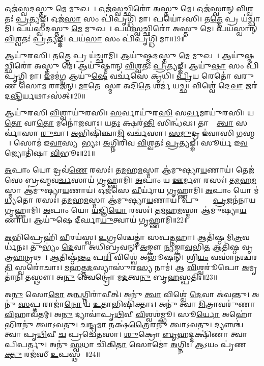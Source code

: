 𑌓𑌜॑𑌸𑍍𑌵𑌦𑌸𑍍𑌤𑍁 \ul{𑌮𑍇} 𑌮𑍁𑌖𑌮𑍍᳚।
𑌓𑌜॑\ul{𑌸𑍍𑌵}𑌚𑍍𑌛𑌿𑌰𑍋॑ 𑌅𑌸𑍍𑌤𑍁 𑌮𑍇।
𑌓𑌜॑𑌸𑍍𑌵𑌾𑌨𑍍 \ul{𑌵𑌿}𑌶𑍍𑌵𑌤𑌃॑ \ul{𑌪𑍍𑌰}𑌤𑍍𑌯𑌙𑍍𑌙𑍍।
𑌓𑌜॑\ul{𑌸𑌾} 𑌸𑌂 𑌪𑌿॑𑌪𑍃𑌗𑍍𑌧𑌿 𑌮𑌾।
𑌪𑌯𑍋॑𑌽𑌸𑌿।
𑌤\ul{𑌤𑍍𑌤𑍇} 𑌪𑍍𑌰 𑌯॑𑌚𑍍𑌛𑌾𑌮𑌿।
𑌪𑌯॑𑌸𑍍𑌵𑌦𑌸𑍍𑌤𑍁 \ul{𑌮𑍇} 𑌮𑍁𑌖𑌮𑍍᳚।
𑌪𑌯॑\ul{𑌸𑍍𑌵}𑌚𑍍𑌛𑌿𑌰𑍋॑ 𑌅𑌸𑍍𑌤𑍁 𑌮𑍇।
𑌪𑌯॑𑌸𑍍𑌵𑌾𑌨𑍍 \ul{𑌵𑌿}𑌶𑍍𑌵𑌤𑌃॑ \ul{𑌪𑍍𑌰}𑌤𑍍𑌯𑌙𑍍𑌙𑍍।
𑌪𑌯॑\ul{𑌸𑌾} 𑌸𑌂 𑌪𑌿॑𑌪𑍃𑌗𑍍𑌧𑌿 𑌮𑌾॥19॥

𑌆𑌯𑍁॑𑌰𑌸𑌿।
𑌤\ul{𑌤𑍍𑌤𑍇} 𑌪𑍍𑌰 𑌯॑𑌚𑍍𑌛𑌾𑌮𑌿।
𑌆𑌯𑍁॑𑌷𑍍𑌮𑌦𑌸𑍍𑌤𑍁 \ul{𑌮𑍇} 𑌮𑍁𑌖𑌮𑍍᳚।
𑌆𑌯𑍁॑\ul{𑌷𑍍𑌮}𑌚𑍍𑌛𑌿𑌰𑍋॑ 𑌅𑌸𑍍𑌤𑍁 𑌮𑍇।
𑌆𑌯𑍁॑𑌷𑍍𑌮𑌾𑌨𑍍 \ul{𑌵𑌿}𑌶𑍍𑌵𑌤𑌃॑ \ul{𑌪𑍍𑌰}𑌤𑍍𑌯𑌙𑍍𑌙𑍍।
𑌆𑌯𑍁॑\ul{𑌷𑌾} 𑌸𑌂 𑌪𑌿॑𑌪𑍃𑌗𑍍𑌧𑌿 𑌮𑌾।
\ul{𑌇}𑌮𑌮॑\ul{𑌗𑍍𑌨} 𑌆𑌯𑍁॑\ul{𑌷𑍇} 𑌵𑌰𑍍𑌚॑𑌸𑍇 𑌕𑍃𑌧𑌿।
\ul{𑌪𑍍𑌰𑌿}𑌯 𑌰𑍇𑌤𑍋॑ 𑌵𑌰𑍁𑌣 𑌸𑍋𑌮 𑌰𑌾𑌜𑌨𑍍।
\ul{𑌮𑌾}𑌤𑍇𑌵𑌾᳚𑌸𑍍𑌮𑌾 𑌅𑌦𑌿\ul{𑌤𑍇} 𑌶𑌰𑍍𑌮॑ 𑌯𑌚𑍍𑌛।
𑌵𑌿𑌶𑍍𑌵𑍇॑ 𑌦𑍇\ul{𑌵𑌾} 𑌜𑌰॑𑌦\ul{𑌷𑍍𑌟𑌿}𑌰𑍍𑌯𑌥𑌾\-𑌽𑌸॑𑌤𑍍॥20॥

𑌆𑌯𑍁॑𑌰𑌸𑌿 \ul{𑌵𑌿}𑌶𑍍𑌵𑌾𑌯𑍁॑𑌰𑌸𑌿।
\ul{𑌸}𑌰𑍍𑌵𑌾𑌯𑍁॑𑌰\ul{𑌸𑌿} 𑌸\ul{𑌰𑍍𑌵}𑌮𑌾𑌯𑍁॑𑌰𑌸𑌿।
𑌯\ul{𑌤𑍋} 𑌵𑌾\ul{𑌤𑍋} 𑌮𑌨𑍋॑𑌜𑌵𑌾𑌃।
𑌯\ul{𑌤𑌃} 𑌕𑍍𑌷𑌰॑\ul{𑌨𑍍𑌤𑌿} 𑌸𑌿𑌨𑍍𑌧॑𑌵𑌃।
𑌤𑌾𑌸𑌾𑌂᳚ \ul{𑌤𑍍𑌵𑌾} 𑌸𑌰𑍍𑌵𑌾॑𑌸𑌾 \ul{𑌰𑍁}𑌚𑌾।
\ul{𑌅}𑌭𑌿𑌷𑌿॑𑌞𑍍𑌚𑌾\ul{𑌮𑌿} 𑌵𑌰𑍍𑌚॑𑌸𑌾।
\ul{𑌸}\ul{𑌮𑍁}𑌦𑍍𑌰 𑌇॑𑌵𑌾𑌸𑌿 \ul{𑌗}𑌹𑍍𑌮𑌨𑌾᳚।
𑌸𑍋𑌮॑ 𑌇\ul{𑌵𑌾}𑌸𑍍𑌯𑌦𑌾᳚𑌭𑍍𑌯𑌃।
\ul{𑌅}𑌗𑍍𑌨𑌿𑌰𑌿॑𑌵 \ul{𑌵𑌿}𑌶𑍍𑌵𑌤𑌃॑ \ul{𑌪𑍍𑌰}𑌤𑍍𑌯𑌙𑍍𑌙𑍍।
𑌸𑍂𑌰𑍍𑌯॑ 𑌇\ul{𑌵} 𑌜𑍍𑌯𑍋𑌤𑌿॑𑌷𑌾 \ul{𑌵𑌿}𑌭𑍂𑌃॥21॥

\ul{𑌅}𑌪𑌾𑌂 𑌯𑍋 𑌦𑍍𑌰𑌵॑\ul{𑌣𑍇} 𑌰𑌸𑌃॑।
𑌤\ul{𑌮}𑌹\ul{𑌮}𑌸𑍍𑌮𑌾 𑌆॑𑌮𑍁𑌷𑍍𑌯𑌾\ul{𑌯}𑌣𑌾𑌯॑।
𑌤𑍇𑌜॑𑌸𑍇 𑌬𑍍𑌰𑌹𑍍𑌮𑌵\ul{𑌰𑍍𑌚}𑌸𑌾𑌯॑ 𑌗𑍃𑌹𑍍𑌣𑌾𑌮𑌿।
\ul{𑌅}𑌪𑌾𑌂 𑌯 \ul{𑌊}𑌰𑍍𑌮𑍗 𑌰𑌸𑌃॑।
𑌤\ul{𑌮}𑌹\ul{𑌮}𑌸𑍍𑌮𑌾 𑌆॑𑌮𑍁𑌷𑍍𑌯𑌾\ul{𑌯}𑌣𑌾𑌯॑।
𑌓𑌜॑𑌸𑍇 \ul{𑌵𑍀}𑌰𑍍𑌯𑌾॑𑌯 𑌗𑍃𑌹𑍍𑌣𑌾𑌮𑌿।
\ul{𑌅}𑌪𑌾𑌂 𑌯𑍋 𑌮॑\ul{𑌧𑍍𑌯}𑌤𑍋 𑌰𑌸𑌃॑।
𑌤\ul{𑌮}𑌹\ul{𑌮}𑌸𑍍𑌮𑌾 𑌆॑𑌮𑍁𑌷𑍍𑌯𑌾\ul{𑌯}𑌣𑌾𑌯॑।
𑌪𑍁𑌷𑍍𑌟𑍍𑌯𑍈᳚ \ul{𑌪𑍍𑌰}𑌜𑌨॑𑌨𑌾𑌯 𑌗𑍃𑌹𑍍𑌣𑌾𑌮𑌿।
\ul{𑌅}𑌪𑌾𑌂 𑌯𑍋 \ul{𑌯}𑌜𑍍𑌞𑌿\ul{𑌯𑍋} 𑌰𑌸𑌃॑।
𑌤\ul{𑌮}𑌹\ul{𑌮}𑌸𑍍𑌮𑌾 𑌆॑𑌮𑍁𑌷𑍍𑌯𑌾\ul{𑌯}𑌣𑌾𑌯॑।
𑌆𑌯𑍁॑𑌷𑍇 𑌦𑍀𑌰𑍍𑌘𑌾\ul{𑌯𑍁}𑌤𑍍𑌵𑌾𑌯॑ 𑌗𑍃𑌹𑍍𑌣𑌾𑌮𑌿॥22॥\anuvakamend[𑌗𑍋𑌷𑍍𑌵𑍋𑌜॑𑌸𑍍𑌵𑌨𑍍𑌤\dng{ꣴ} 𑌶𑍍𑌰𑍀\ul{𑌣𑌾}𑌮𑍍𑌯𑍋𑌜𑍋॑𑌽\ul{𑌸𑌿} 𑌤\ul{𑌤𑍍𑌤𑍇} 𑌪𑍍𑌰𑌯॑𑌚𑍍𑌛𑌾\ul{𑌮𑌿} 𑌪𑌯॑\ul{𑌸𑌾} 𑌸𑌮𑍍𑌪𑌿॑𑌪𑍃\ul{𑌗𑍍𑌧𑌿} 𑌮𑌾𑌽𑌸॑\ul{𑌦𑍍𑌵𑌿}𑌭𑍂\ul{𑌰𑍍𑌯}𑌜𑍍𑌞𑌿\ul{𑌯𑍋} 𑌰\ul{𑌸𑍋} 𑌦𑍍𑌵𑍇 𑌚॑]

\ul{𑌅}𑌭𑌿𑌪𑍍𑌰𑍇𑌹𑌿॑ \ul{𑌵𑍀}𑌰𑌯॑𑌸𑍍𑌵।
\ul{𑌉}𑌗𑍍𑌰𑌶𑍍𑌚𑍇𑌤𑍍𑌤𑌾॑ 𑌸𑌪\ul{𑌤𑍍𑌨}𑌹𑌾।
𑌆𑌤𑌿॑𑌷𑍍𑌠 𑌮𑌿\ul{𑌤𑍍𑌰}𑌵𑌰𑍍𑌧॑𑌨𑌃।
𑌤𑍁𑌭𑍍𑌯𑌂॑ \ul{𑌦𑍇}𑌵𑌾 𑌅𑌧𑌿॑𑌬𑍍𑌰𑌵𑌨𑍍।
\ul{𑌅}𑌙𑍍𑌕𑍗 \ul{𑌨𑍍𑌯}𑌙𑍍𑌕𑌾\ul{𑌵}𑌭𑌿\ul{𑌤} 𑌆𑌤𑌿॑𑌷𑍍𑌠 𑌵𑍃𑌤𑍍𑌰\ul{𑌹}𑌨𑍍𑌰𑌥𑌮𑍍᳚।
\ul{𑌆}𑌤𑌿𑌷𑍍𑌠॑\ul{𑌨𑍍𑌤𑌂} 𑌪\ul{𑌰𑌿} 𑌵𑌿𑌶𑍍𑌵𑍇॑ 𑌅𑌭𑍂𑌷𑌨𑍍।
𑌶𑍍𑌰𑌿\ul{𑌯𑌂} 𑌵𑌸𑌾॑𑌨𑌶𑍍𑌚𑌰\ul{𑌤𑌿} 𑌸𑍍𑌵𑌰𑍋॑𑌚𑌾𑌃।
\ul{𑌮}𑌹𑌤𑍍𑌤\ul{𑌦}𑌸𑍍𑌯𑌾𑌸𑍁॑𑌰\ul{𑌸𑍍𑌯} 𑌨𑌾𑌮॑।
𑌆 \ul{𑌵𑌿}𑌶𑍍𑌵𑌰𑍂॑𑌪𑍋 \ul{𑌅}𑌮𑍃𑌤𑌾॑𑌨𑌿 𑌤𑌸𑍍𑌥𑍗।
𑌅\ul{𑌨𑍁} 𑌤𑍍𑌵𑍇𑌨𑍍𑌦𑍍𑌰𑍋॑ 𑌮\ul{𑌦}𑌤𑍍𑌵\ul{𑌨𑍁} 𑌬𑍃\ul{𑌹}𑌸𑍍𑌪𑌤𑌿𑌃॑॥23॥

𑌅\ul{𑌨𑍁} 𑌸𑍋\ul{𑌮𑍋} 𑌅\ul{𑌨𑍍𑌵}𑌗𑍍𑌨𑌿𑌰𑌾॑𑌵𑍀𑌤𑍍।
𑌅𑌨𑍁॑ \ul{𑌤𑍍𑌵𑌾} 𑌵𑌿𑌶𑍍𑌵𑍇॑ \ul{𑌦𑍇}𑌵𑌾 𑌅॑𑌵𑌨𑍍𑌤𑍁।
𑌅𑌨𑍁॑ \ul{𑌸}𑌪𑍍𑌤 𑌰𑌾𑌜𑌾॑\ul{𑌨𑍋} 𑌯 \ul{𑌉}𑌤𑌾𑌭𑌿𑌷𑌿॑𑌕𑍍𑌤𑌾𑌃।
𑌅𑌨𑍁॑ 𑌤𑍍𑌵𑌾 \ul{𑌮𑌿}𑌤𑍍𑌰𑌾𑌵𑌰𑍁॑𑌣𑌾\ul{𑌵𑌿}𑌹𑌾𑌵॑𑌤𑌮𑍍।
𑌅\ul{𑌨𑍁} 𑌦𑍍𑌯𑌾𑌵𑌾॑𑌪𑍃\ul{𑌥𑌿}𑌵𑍀 \ul{𑌵𑌿}𑌶𑍍𑌵𑌶॑𑌮𑍍𑌭𑍂।
𑌸𑍂\ul{𑌰𑍍𑌯𑍋} 𑌅𑌹𑍋॑\ul{𑌭𑌿}𑌰𑌨𑍁॑ 𑌤𑍍𑌵𑌾𑌽𑌵𑌤𑍁।
\ul{𑌚}𑌨𑍍𑌦𑍍𑌰\ul{𑌮𑌾} 𑌨𑌕𑍍𑌷॑\ul{𑌤𑍍𑌰𑍈}𑌰𑌨𑍁॑ 𑌤𑍍𑌵𑌾𑌽𑌵𑌤𑍁।
𑌦𑍍𑌯𑍗𑌶𑍍𑌚॑ 𑌤𑍍𑌵𑌾 𑌪𑍃\ul{𑌥𑌿}𑌵𑍀 \ul{𑌚} 𑌪𑍍𑌰𑌚𑍇॑𑌤𑌸𑌾।
\ul{𑌶𑍁}𑌕𑍍𑌰𑍋 \ul{𑌬𑍃}𑌹𑌦𑍍𑌦𑌕𑍍𑌷𑌿॑𑌣𑌾 𑌤𑍍𑌵𑌾 𑌪𑌿𑌪𑌰𑍍𑌤𑍁।
𑌅𑌨𑍁॑ \ul{𑌸𑍍𑌵}𑌧𑌾 𑌚𑌿॑𑌕𑌿\ul{𑌤𑌾}\ul{} 𑌸𑍋𑌮𑍋॑ \ul{𑌅}𑌗𑍍𑌨𑌿𑌃।
𑌆𑌽𑌯𑌂 𑌪𑍃॑𑌣\ul{𑌕𑍍𑌤𑍁} 𑌰𑌜॑𑌸𑍀 \ul{𑌉}𑌪𑌸𑍍𑌥𑌮𑍍᳚॥24॥\anuvakamend[𑌬𑍃\ul{𑌹}𑌸𑍍𑌪\ul{𑌤𑌿𑌃} 𑌸𑍋𑌮𑍋॑ \ul{𑌅}𑌗𑍍𑌨𑌿𑌰𑍇𑌕𑌂॑ 𑌚]

